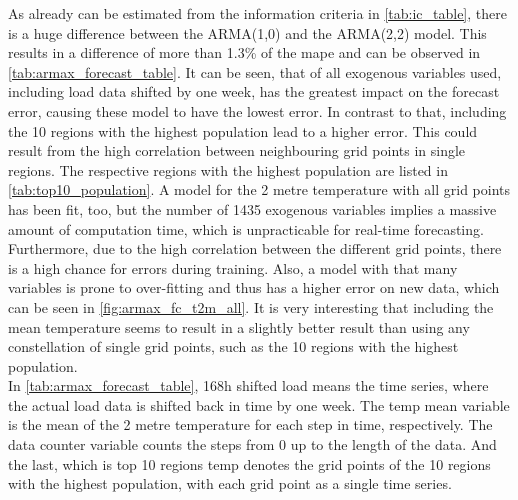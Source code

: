 As already can be estimated from the information criteria in \cref{tab:ic_table}, there is a huge difference between the ARMA(1,0) and the ARMA(2,2) model. This results in a difference of more than 1.3\% of the \gls{mape} and can be observed in \cref{tab:armax_forecast_table}. It can be seen, that of all exogenous variables used, including load data shifted by one week, has the greatest impact on the forecast error, causing these model to have the lowest error. In contrast to that, including the 10 regions with the highest population lead to a higher error. This could result from the high correlation between neighbouring grid points in single regions. The respective regions with the highest population are listed in \cref{tab:top10_population}. A model for the 2 metre temperature with all grid points has been fit, too, but the number of 1435 exogenous variables implies a massive amount of computation time, which is unpracticable for real-time forecasting. Furthermore, due to the high correlation between the different grid points, there is a high chance for errors during training. Also, a model with that many variables is prone to over-fitting and thus has a higher error on new data, which can be seen in \cref{fig:armax_fc_t2m_all}. It is very interesting that including the mean temperature seems to result in a slightly better result than using any constellation of single grid points, such as \eg the 10 regions with the highest population.\\

In \cref{tab:armax_forecast_table}, 168h shifted load means the time series, where the actual load data is shifted back in time by one week. The temp mean variable is the mean of the 2 metre temperature for each step in time, respectively. The data counter variable counts the steps from 0 up to the length of the data. And the last, which is top 10 regions temp denotes the grid points of the 10 regions with the highest population, with each grid point as a single time series.\\

